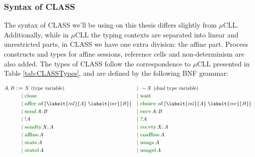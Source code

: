 \subsubsection{Syntax of CLASS}

The syntax of CLASS we'll be using on this thesis differs slightly from $\mu$CLL. Additionally, while in $\mu$CLL the typing contexts are separated into linear and unrestricted parts, in CLASS we have one extra division: the affine part. Process constructs and types for affine sessions, reference cells and non-determinism are also added. The types of CLASS follow the correspondence to $\mu$CLL presented in Table \ref{tab:CLASSTypes}, and are defined by the following BNF grammar:

\begin{align*}
    A, B ::=\  & X \text{ (type variable)}                 &  & |\ \sim X \text{ (dual type variable)}        \\
    |\         & \closet                                   &  & |\ \waitt                                     \\
    |\         & \offert{\labelt{inl}{A}\ \labelt{inr}{B}} &  & |\ \choicet{\labelt{inl}{A}\ \labelt{inr}{B}} \\
    |\         & \sendt{A}{B}                              &  & |\ \recvt{A}{B}                               \\
    |\         & \bangt{A}                                 &  & |\ \whynott{A}                                \\
    |\         & \sendtyt{X}{A}                            &  & |\ \recvtyt{X}{A}                             \\
    |\         & \affinet{A}                               &  & |\ \coaffinet{A}                              \\
    |\         & \statet{A}                                &  & |\ \usaget{A}                                 \\
    |\         & \statelt{A}                               &  & |\ \usagelt{A}                                \\
\end{align*}

